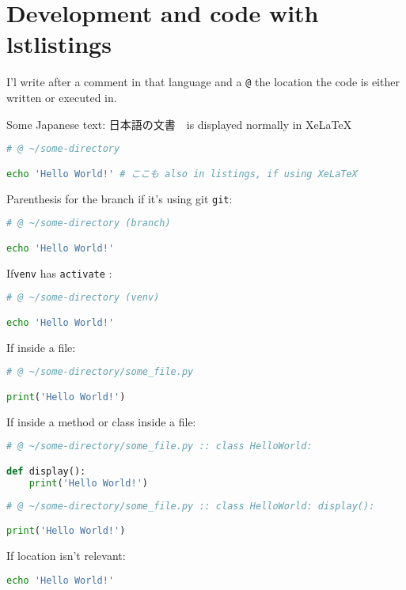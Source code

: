\chapter{Development and code with lstlistings}\label{dev}

I'l write after a comment in that language and a \lstinline{@} the location the code is either written or executed in.

Some Japanese text: 日本語の文書　is displayed normally in XeLaTeX

\begin{lstlisting}[language=bash, title={small Execute in: bash}]
# @ ~/some-directory

echo 'Hello World!' # ここも also in listings, if using XeLaTeX
\end{lstlisting}

Parenthesis for the branch if it's using git \lstinline{git}:

\begin{lstlisting}[language=bash, title={small Execute in: bash}]
# @ ~/some-directory (branch)

echo 'Hello World!'
\end{lstlisting}

If\lstinline{venv} has \lstinline{activate} :

\begin{lstlisting}[language=bash, title={small Execute in: bash}]
# @ ~/some-directory (venv)

echo 'Hello World!'
\end{lstlisting}

If inside a file:
\begin{lstlisting}[language=python, title={small Language: python}]
# @ ~/some-directory/some_file.py

print('Hello World!')
\end{lstlisting}

If inside a method or class inside a file:

\begin{lstlisting}[language=python, title={small Language: python}]
# @ ~/some-directory/some_file.py :: class HelloWorld:

def display():
    print('Hello World!')
\end{lstlisting}

\begin{lstlisting}[language=python, title={small Language: python}]
# @ ~/some-directory/some_file.py :: class HelloWorld: display():

print('Hello World!')
\end{lstlisting}

If location isn't relevant:

\begin{lstlisting}[language=bash, title={small Execute in: bash}]
echo 'Hello World!'
\end{lstlisting}






